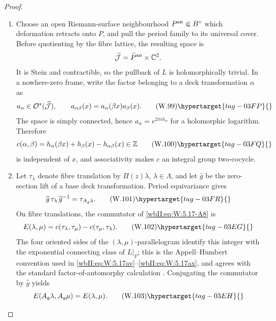 \begin{proof}

\begin{enumerate}[label=\arabic*.,leftmargin=*]
\item Choose an open Riemann-surface neighbourhood \(P^{\rm an}\Subset B^\circ\)
which deformation retracts onto \(P\), and pull the period family to its
universal cover.  Before quotienting by the fibre lattice, the resulting
space is
\[
 \widetilde{\mathcal J}
 =\widetilde P^{\rm an}\times\mathbb C^2.
\]
It is Stein and contractible, so the pullback of \(L\) is holomorphically
trivial.  In a nowhere-zero frame, write the factor belonging to a deck
transformation \(\alpha\) as
\[
 a_\alpha\in\mathcal O^*(\widetilde{\mathcal J}),
 \qquad
 a_{\alpha\beta}(x)=a_\alpha(\beta x)a_\beta(x).
\tag{W.99}\hypertarget{tag-03FP}{}\label{wbII:eq:W:5.17-A7}
\]
The space is simply connected, hence \(a_\alpha=e^{2\pi i h_\alpha}\) for
a holomorphic logarithm.  Therefore
\[
 c(\alpha,\beta)
 =h_\alpha(\beta x)+h_\beta(x)-h_{\alpha\beta}(x)\in\mathbb Z
\tag{W.100}\hypertarget{tag-03FQ}{}\label{wbII:eq:W:5.17-A8}
\]
is independent of \(x\), and associativity makes \(c\) an integral group
two-cocycle.

\item Let \(\tau_\lambda\) denote fibre translation by
\(\Pi(z)\lambda\), \(\lambda\in\Lambda\), and let \(\widehat g\) be the
zero-section lift of a base deck transformation.  Period equivariance gives
\[
 \widehat g\,\tau_\lambda\,\widehat g^{-1}
 =\tau_{A_g\lambda}.
\tag{W.101}\hypertarget{tag-03FR}{}\label{wbII:eq:W:5.17-A9}
\]
On fibre translations, the commutator of \eqref{wbII:eq:W:5.17-A8} is
\[
 E(\lambda,\mu)
 =c(\tau_\lambda,\tau_\mu)-c(\tau_\mu,\tau_\lambda).
\tag{W.102}\hypertarget{tag-03EG}{}\label{wbII:eq:W:5.17-A10}
\]
The four oriented sides of the \((\lambda,\mu)\)-parallelogram identify
this integer with the exponential connecting class of \(L|_F\); this is
the Appell--Humbert convention used in
\eqref{wbII:eq:W:5.17av}--\eqref{wbII:eq:W:5.17ax}, and agrees with the standard factor-of-automorphy
calculation
\cite[equations~(3.3)--(3.10), pp.~3--7]{SchnellLecture3}.
Conjugating the commutator by \(\widehat g\) yields
\[
 E(A_g\lambda,A_g\mu)=E(\lambda,\mu).
\tag{W.103}\hypertarget{tag-03EH}{}\label{wbII:eq:W:5.17-A11}
\]


\end{enumerate}
\end{proof}
